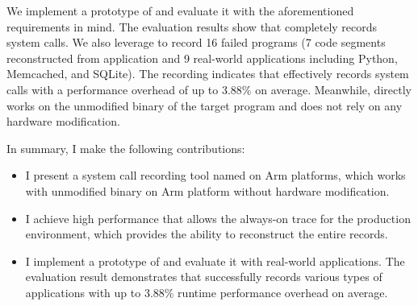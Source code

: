 We implement a prototype of \TheName{} and evaluate it with the 
aforementioned requirements in mind. The evaluation results show that
\TheName{} completely records system calls. 
We also leverage \TheName to record 16 failed programs (7 code segments 
reconstructed from application and 9 real-world applications including Python, Memcached, and SQLite). The recording indicates that \TheName effectively records system calls
 with a performance overhead of
up to 3.88\% on average. Meanwhile, \TheName{} directly works on the unmodified binary of the target 
program and does not rely on any hardware modification.



In summary, I make the following contributions:
\begin{itemize}
    \item I present a system call recording tool named \TheName{} on Arm platforms, which 
     works with
    unmodified binary on Arm platform without hardware modification.
    \item I achieve high performance that allows the
    always-on trace for the production environment, which provides \TheName{} the ability
    to reconstruct the entire records.
    \item I implement a prototype of \TheName{} and evaluate it with
    real-world applications.
    The evaluation result demonstrates that \TheName{} successfully records
    various types of applications with up to 3.88\% runtime
    performance overhead on average.
  \end{itemize}
  